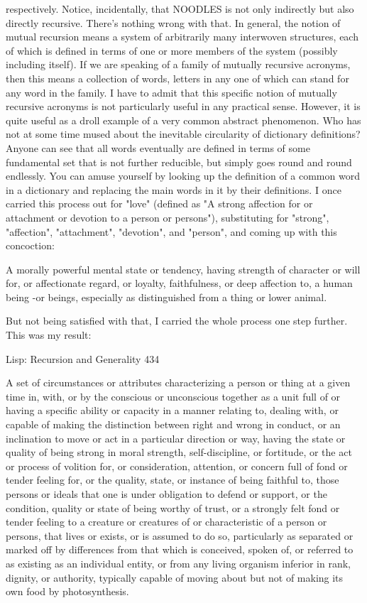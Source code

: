 respectively. Notice, incidentally, that NOODLES is not only indirectly but also
directly recursive. There's nothing wrong with that.
        In general, the notion of mutual recursion means a system of arbitrarily many
interwoven structures, each of which is defined in terms of one or more members of
the system (possibly including itself). If we are speaking of a family of mutually
recursive acronyms, then this means a collection of words, letters in any one of which
can stand for any word in the family.
I have to admit that this specific notion of mutually recursive acronyms is not
particularly useful in any practical sense. However, it is quite useful as a droll
example of a very common abstract phenomenon. Who has not at some time mused
about the inevitable circularity of dictionary definitions? Anyone can see that all
words eventually are defined in terms of some fundamental set that is not further
reducible, but simply goes round and round endlessly. You can amuse yourself by
looking up the definition of a common word in a dictionary and replacing the main
words in it by their definitions. I once carried this process out for "love" (defined as
"A strong affection for or attachment or devotion to a person or persons"), substituting
for "strong", "affection", "attachment", "devotion", and "person", and coming up with
this concoction:

  A morally powerful mental state or tendency, having strength of character or
  will for, or affectionate regard, or loyalty, faithfulness, or deep affection to, a
  human being -or beings, especially as distinguished from a thing or lower
  animal.

But not being satisfied with that, I carried the whole process one step further. This
was my result:




Lisp: Recursion and Generality                                                      434

  A set of circumstances or attributes characterizing a person or thing at a given
  time in, with, or by the conscious or unconscious together as a unit full of or
  having a specific ability or capacity in a manner relating to, dealing with, or
  capable of making the distinction between right and wrong in conduct, or an
  inclination to move or act in a particular direction or way, having the state or
  quality of being strong in moral strength, self-discipline, or fortitude, or the act
  or process of volition for, or consideration, attention, or concern full of fond or
  tender feeling for, or the quality, state, or instance of being faithful to, those
  persons or ideals that one is under obligation to defend or support, or the
  condition, quality or state of being worthy of trust, or a strongly felt fond or
  tender feeling to a creature or creatures of or characteristic of a person or
  persons, that lives or exists, or is assumed to do so, particularly as separated or
  marked off by differences from that which is conceived, spoken of, or referred
  to as existing as an individual entity, or from any living organism inferior in
  rank, dignity, or authority, typically capable of moving about but not of making
  its own food by photosynthesis.

